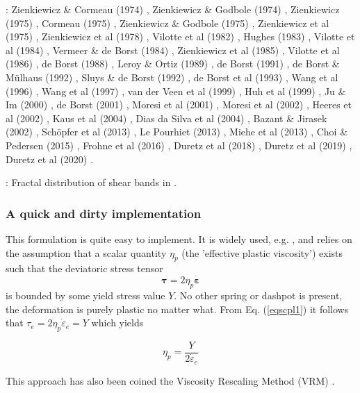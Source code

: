 
\Literature: 
Zienkiewicz \& Cormeau (1974) \cite{zico74,zico74b},
Zienkiewicz \& Godbole (1974) \cite{zigo74},
Zienkiewicz (1975) \cite{zien75},
Cormeau (1975) \cite{corm75},
Zienkiewicz \& Godbole (1975) \cite{zigo75},
Zienkiewicz et al (1975) \cite{zihl75},
Zienkiewicz et al (1978) \cite{zijo78},
Vilotte et al (1982) \cite{vidm82},
Hughes (1983) \cite{hugh83},
Vilotte et al (1984) \cite{vidm84},
Vermeer \& de Borst (1984) \cite{vede84},
Zienkiewicz et al (1985) \cite{zivt85},
Vilotte et al (1986) \cite{vimd86},
de Borst (1988) \cite{debo88},
Leroy \& Ortiz (1989) \cite{leor89},
de Borst (1991) \cite{debo91},
de Borst \& M{\"u}lhaus (1992) \cite{demu92},
Sluys \& de Borst (1992) \cite{slde92},
de Borst et al (1993) \cite{desm93},
Wang et al (1996) \cite{wasd96},
Wang et al (1997) \cite{wasd97},
van der Veen et al (1999) \cite{vavd99},
Huh et al (1999) \cite{huhy99},
Ju \& Im (2000) \cite{juim00},
de Borst (2001) \cite{debo01},
Moresi et al (2001) \cite{modm01},
Moresi et al (2002) \cite{modm02},
Heeres et al (2002) \cite{hesd02},
Kaus et al (2004) \cite{kaps04},
Dias da Silva et al (2004) \cite{dias04},
Bazant \& Jirasek (2002) \cite{baji02},
Sch{\"o}pfer et al (2013) \cite{sccm13},
Le Pourhiet (2013) \cite{lepo13},
Miehe et al (2013) \cite{miam13},
Choi \& Pedersen (2015) \cite{chpe15},
Frohne et al (2016) \cite{frhb16},
Duretz et al (2018) \cite{dusd18},
Duretz et al (2019) \cite{dudl19},
Duretz et al (2020) \cite{dudy20}.


\Literature: 
Fractal distribution of shear bands in \cite{pohp94,pohe94}.





\subsubsection{A quick and dirty implementation}

This formulation is quite easy to implement. It is widely used, e.g. \cite{will92,thfb08,spmw16}, and relies on the assumption that 
a scalar quantity $\eta_p$ (the 'effective plastic viscosity') exists such that the deviatoric stress tensor 
\begin{equation}
{\bm \tau}=2\eta_p \dot{\bm\varepsilon} \label{eqscpl1}
\end{equation}
is bounded by some yield stress value $Y$. No other spring or dashpot is present, the deformation is purely plastic no 
matter what.
From Eq. (\ref{eqscpl1}) it follows that ${\tau}_{e}= 2\eta_p \dot{\varepsilon}_{e}=Y$ which yields
\begin{mdframed}[backgroundcolor=blue!5]
\[
\eta_p = \frac{Y}{2 \dot{\varepsilon}_{e}}
\]
\end{mdframed}
This approach has also been coined the Viscosity Rescaling Method (VRM) \cite{kacha04}. 
 

